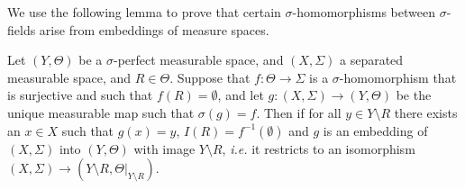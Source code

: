 \documentclass{lmcs}
\begin{document}
We use the following lemma to prove that certain $\sigma$-homomorphisms between $\sigma$-fields arise from embeddings of measure spaces.
\begin{lem}
\label{PrincipalMbleEmbeddingLemma}
Let $(Y,\Theta)$ be a $\sigma$-perfect measurable space, and $(X,\Sigma)$ a separated measurable space, and $R \in \Theta$. Suppose that $f : \Theta \rightarrow \Sigma$ is a $\sigma$-homomorphism that is surjective and such that $f(R) = \emptyset$, and let $g : (X,\Sigma) \rightarrow (Y,\Theta)$ be the unique measurable map such that $\sigma(g) = f$. Then if for all $y \in Y \setminus R$ there exists an $x \in X$ such that $g(x) = y$, $I(R) = f^{-1}(\emptyset)$ and $g$ is an embedding of $(X,\Sigma)$ into $(Y,\Theta)$ with image $Y \setminus R$, \emph{i.e.} it restricts to an isomorphism $(X,\Sigma) \rightarrow (Y \setminus R, \Theta|_{Y\setminus R})$. 
\end{lem}
\end{document}

